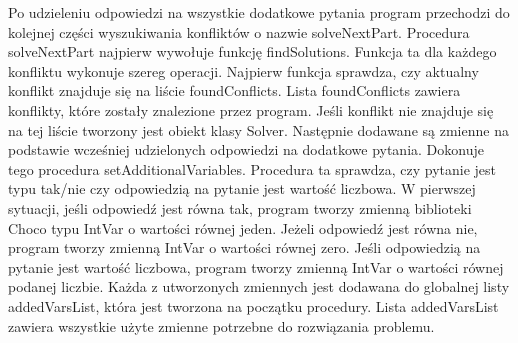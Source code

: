 Po udzieleniu odpowiedzi na wszystkie dodatkowe pytania program przechodzi do kolejnej części wyszukiwania konfliktów o nazwie solveNextPart. Procedura solveNextPart najpierw wywołuje funkcję findSolutions. 
Funkcja ta dla każdego konfliktu wykonuje szereg operacji. Najpierw funkcja sprawdza, czy aktualny konflikt znajduje się na liście foundConflicts. Lista foundConflicts zawiera konflikty, które zostały znalezione przez program. Jeśli konflikt nie znajduje się na tej liście tworzony jest obiekt klasy Solver. Następnie dodawane są zmienne na podstawie wcześniej udzielonych odpowiedzi na dodatkowe pytania. Dokonuje tego procedura setAdditionalVariables. Procedura ta sprawdza, czy pytanie jest typu tak/nie czy odpowiedzią na pytanie jest wartość liczbowa. W pierwszej sytuacji, jeśli odpowiedź jest równa tak, program tworzy zmienną biblioteki Choco typu IntVar o wartości równej jeden. Jeżeli odpowiedź jest równa nie, program tworzy zmienną IntVar o wartości równej zero. Jeśli odpowiedzią na pytanie jest wartość liczbowa, program tworzy zmienną IntVar o wartości równej podanej liczbie. Każda z utworzonych zmiennych jest dodawana do globalnej listy addedVarsList, która jest tworzona na początku procedury. 
Lista addedVarsList zawiera wszystkie użyte zmienne potrzebne do rozwiązania problemu.

